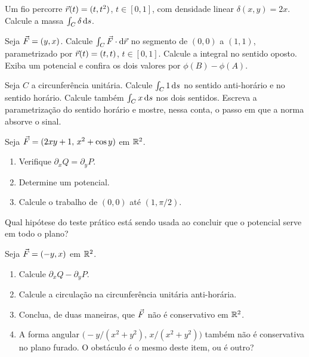 \documentclass[11pt,a4paper]{article}
\begin{document}
\begin{exercicio}
Um fio percorre $\vec{r}(t)=(t,t^2)$, $t\in[0,1]$, com densidade linear $\delta(x,y)=2x$. Calcule a massa $\int_C\delta\,\mathrm{d} s$.
\end{exercicio}

\begin{exercicio}
Seja $\vec{F}=(y,x)$. Calcule $\int_C\vec{F}\cdot\mathrm{d}\vec{r}$ no segmento de $(0,0)$ a $(1,1)$, parametrizado por $\vec{r}(t)=(t,t)$, $t\in[0,1]$. Calcule a integral no sentido oposto. Exiba um potencial e confira os dois valores por $\phi(B)-\phi(A)$.
\end{exercicio}

\begin{exercicio}
Seja $C$ a circunferência unitária. Calcule $\int_C 1\,\mathrm{d} s$ no sentido anti-horário e no sentido horário. Calcule também $\int_C x\,\mathrm{d} s$ nos dois sentidos. Escreva a parametrização do sentido horário e mostre, nessa conta, o passo em que a norma absorve o sinal.
\end{exercicio}

\begin{exercicio}
Seja $\vec{F}=(2xy+1,\, x^2+\cos y)$ em $\mathbb{R}^2$.
\begin{enumerate}
\item Verifique $\partial_x Q=\partial_y P$.
\item Determine um potencial.
\item Calcule o trabalho de $(0,0)$ até $(1,\pi/2)$.
\end{enumerate}
Qual hipótese do teste prático está sendo usada ao concluir que o potencial serve em todo o plano?
\end{exercicio}

\begin{exercicio}
Seja $\vec{F}=(-y,x)$ em $\mathbb{R}^2$.
\begin{enumerate}
\item Calcule $\partial_x Q-\partial_y P$.
\item Calcule a circulação na circunferência unitária anti-horária.
\item Conclua, de duas maneiras, que $\vec{F}$ não é conservativo em $\mathbb{R}^2$.
\item A forma angular $\bigl(-y/(x^2+y^2),\, x/(x^2+y^2)\bigr)$ também não é conservativa no plano furado. O obstáculo é o mesmo deste item, ou é outro?
\end{enumerate}
\end{exercicio}
\end{document}
